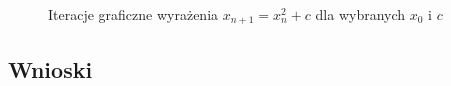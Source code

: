 \documentclass[11pt]{mk-polish-lab-report}
\begin{document}
\begin{figure}[h]
\hfill
\caption{Iteracje graficzne wyrażenia $x_{n+1}=x_n^2 + c$ dla wybranych $x_0$ i $c$} 
\end{figure}

\subsection{Wnioski}
\end{document}
